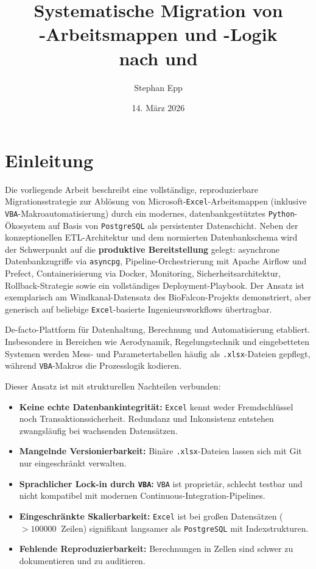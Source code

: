 ﻿\documentclass[12pt,a4paper]{report}
\title{Systematische Migration von\\[0.3em]
	\excel-Arbeitsmappen und \vba-Logik\\[0.3em]
	nach \pg{} und \py}
\author{Stephan Epp}
\date{14. März 2026}
\theoremstyle{definition}
\theoremstyle{remark}
\newcommand{\excel}{\texttt{Excel}}
\newcommand{\vba}{\texttt{VBA}}
\newcommand{\pg}{\texttt{PostgreSQL}}
\newcommand{\py}{\texttt{Python}}
\newcommand{\code}[1]{\texttt{#1}}
\begin{document}
\maketitle
\tableofcontents
\newpage

\chapter{Einleitung}
Die vorliegende Arbeit beschreibt eine vollständige, reproduzierbare
Migrationsstrategie zur Ablösung von Microsoft-\excel-Arbeitsmappen
(inklusive \vba-Makroautomatisierung) durch ein modernes,
datenbankgestütztes \py-Ökosystem auf Basis von \pg{} als persistenter
Datenschicht. Neben der konzeptionellen ETL-Architektur und dem
normierten Datenbankschema wird der Schwerpunkt auf die
\textbf{produktive Bereitstellung} gelegt: asynchrone Datenbankzugriffe
via \code{asyncpg}, Pipeline-Orchestrierung mit Apache Airflow und Prefect,
Containerisierung via Docker, Monitoring, Sicherheitsarchitektur,
Rollback-Strategie sowie ein vollständiges Deployment-Playbook.
Der Ansatz ist exemplarisch am Windkanal-Datensatz des BioFalcon-Projekts
demonstriert, aber generisch auf beliebige \excel-basierte Ingenieursworkflows
übertragbar.

De-facto-Plattform für Datenhaltung, Berechnung und Automatisierung
etabliert. Insbesondere in Bereichen wie Aerodynamik, Regelungstechnik
und eingebetteten Systemen werden Mess- und Parametertabellen häufig als
\code{.xlsx}-Dateien gepflegt, während \vba-Makros die Prozesslogik kodieren.

Dieser Ansatz ist mit strukturellen Nachteilen verbunden:

\begin{itemize}[leftmargin=1.5em]
  \item \textbf{Keine echte Datenbankintegrität:} \excel{} kennt weder
        Fremdschlüssel noch Transaktionssicherheit. Redundanz und
        Inkonsistenz entstehen zwangsläufig bei wachsenden Datensätzen.
  \item \textbf{Mangelnde Versionierbarkeit:} Binäre \code{.xlsx}-Dateien
        lassen sich mit Git nur eingeschränkt verwalten.
  \item \textbf{Sprachlicher Lock-in durch \vba:} \vba{} ist proprietär,
        schlecht testbar und nicht kompatibel mit modernen
        Continuous-Integration-Pipelines.
  \item \textbf{Eingeschränkte Skalierbarkeit:} \excel{} ist bei gro\ss{}en
        Datensätzen ($> \SI{100000}{}$ Zeilen) signifikant langsamer als
        \pg{} mit Indexstrukturen.
  \item \textbf{Fehlende Reproduzierbarkeit:} Berechnungen in Zellen sind
        schwer zu dokumentieren und zu auditieren.
\end{itemize}
\end{document}
